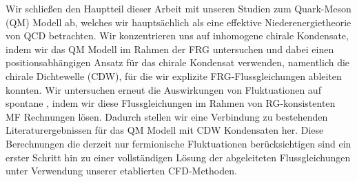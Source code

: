 Wir schließen den Hauptteil dieser Arbeit mit unseren Studien zum \fourDimensional{} Quark-Meson (QM) Modell ab, welches wir hauptsächlich als eine effektive Niederenergietheorie von QCD betrachten.
Wir konzentrieren uns auf inhomogene chirale Kondensate, indem wir das QM Modell im Rahmen der FRG untersuchen und dabei einen positionsabhängigen Ansatz für das chirale Kondensat verwenden, namentlich die chirale Dichtewelle (CDW), für die wir explizite FRG-Flussgleichungen ableiten konnten.
Wir untersuchen erneut die Auswirkungen von Fluktuationen auf spontane \csb{}, indem wir diese Flussgleichungen im Rahmen von RG-konsistenten MF Rechnungen lösen.
Dadurch stellen wir eine Verbindung zu bestehenden Literaturergebnissen für das QM Modell mit CDW Kondensaten her.
Diese Berechnungen \dash{} die derzeit nur fermionische Fluktuationen berücksichtigen \dash{} sind ein erster Schritt hin zu einer vollständigen Lösung der abgeleiteten Flussgleichungen unter Verwendung unserer etablierten CFD-Methoden.